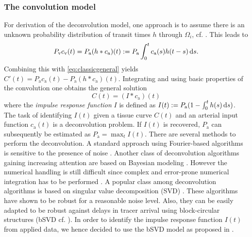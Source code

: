 \documentclass[aps,prb,article,groupedaddress,showkeys]{revtex4}
\begin{document}
	

	\subsubsection{The convolution model}\label{sec:conv}
	For derivation of the deconvolution model, one approach is to assume there is an unknown probability distribution of transit times $h$ through $\Omega_i$, cf. \cite{sourbron13}. 
	This leads to
	\begin{equation}
		P_{\mathrm{v}}c_{\mathrm{v}}(t) = P_{\mathrm{a}}(h\ast c_\mathrm{a})(t) := P_{\mathrm{a}}\int_0^t c_\mathrm{a}(s) h(t-s) \,\mathrm{d} s.
	\end{equation}
	Combining this with \eqref{eq:classicgeneral} yields $C'(t) = P_{\mathrm{a}}c_\mathrm{a}(t)-P_{\mathrm{a}} (h\ast c_\mathrm{a})(t)$.
	Integrating and using basic properties of the convolution one obtains the general solution
	\begin{equation}
		C(t) = (I\ast c_\mathrm{a})(t)
		\label{eq:conv}
	\end{equation}
	where the \emph{impulse response function} $I$ is defined as $I(t) := P_{\mathrm{a}}(1-\int_0^t h(s) \,\mathrm{d} s)$.
	The task of identifying $I(t)$ given a tissue curve $C(t)$ and an arterial input function $c_\mathrm{a}(t)$ is a deconvolution problem.
	If $I(t)$ is recovered, $P_{\mathrm{a}}$ can subsequently be estimated as $P_{\mathrm{a}} = \max_{t} I(t)$.
	There are several methods to perform the deconvolution.
	A standard approach using Fourier-based algorithms is sensitive to the presence of noise \cite{ostergaard96}.
	Another class of deconvolution algorithms gaining increasing attention are based on Bayesian modeling \cite{boutelier12}.
	However the numerical handling is still difficult since complex and error-prone numerical integration has to be performed \cite{boutelier12}.
	A popular class among deconvolution algorithms is based on singular value decomposition (SVD) \cite{ostergaard96}.
	These algorithms have shown to be robust for a reasonable noise level.
	Also, they can be easily adapted to be robust against delays in tracer arrival using block-circular structures (bSVD cf. \cite{wu03}).
	In order to identify the impulse response function $I(t)$ from applied data, we hence decided to use the bSVD model as proposed in \cite{wu03}.

	
	
\end{document}

